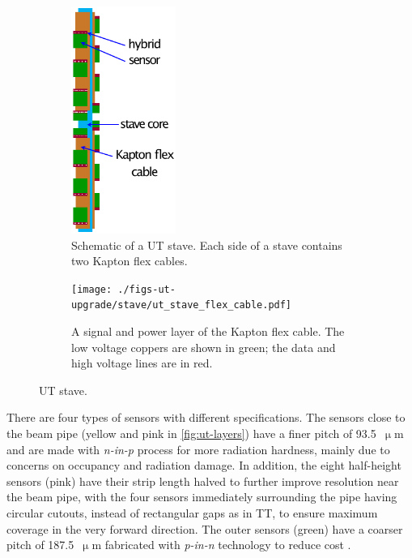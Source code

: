 \begin{figure}[!htb]
    \centering
    \begin{subfigure}[t]{0.48\textwidth}
        \centering
        \includegraphics[height=20em]{./figs-ut-upgrade/stave/ut_stave.pdf}
        \caption{
            Schematic of a UT stave.
            Each side of a stave contains two Kapton flex cables.
        }
    \end{subfigure}
    \hspace{10pt}
    \begin{subfigure}[t]{0.48\textwidth}
        \centering
        \texttt{[image: ./figs-ut-upgrade/stave/ut\_stave\_flex\_cable.pdf]}
        \caption{
            A signal and power layer of the Kapton flex cable.
            The low voltage coppers are shown in green;
            the data and high voltage lines are in red.
        }
    \end{subfigure}

    \caption{
        UT stave.
    }
    \label{fig:stave}
\end{figure}

There are four types of sensors with different specifications.
The sensors close to the beam pipe (yellow and pink in \cref{fig:ut-layers})
have a finer pitch of 93.5~$\upmu$m and are made with \emph{n-in-p} process for
more radiation hardness,
mainly due to concerns on occupancy and radiation damage.
In addition, the eight half-height sensors (pink) have their strip length halved
to further improve resolution near the beam pipe,
with the four sensors immediately surrounding the pipe having
circular cutouts, instead of rectangular gaps as in TT, to ensure maximum
coverage in the very forward direction.
The outer sensors (green) have a coarser pitch of 187.5~$\upmu$m fabricated with
\emph{p-in-n} technology to reduce cost
\cite{Carli:2783293}.


